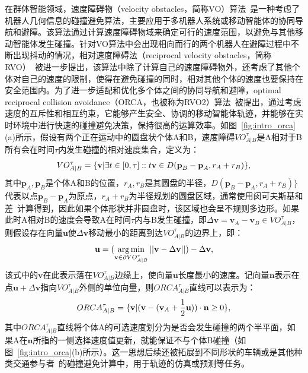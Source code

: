 在群体智能领域，速度障碍物（velocity obstacles，简称VO）算法~\cite{fiorini1998motion}是一种考虑了机器人几何信息的碰撞避免算法，主要应用于多机器人系统或移动智能体的协同导航和避障。该算法通过计算速度障碍物域来确定可行的速度范围，以避免与其他移动智能体发生碰撞。针对VO算法中会出现相向而行的两个机器人在避障过程中不断出现抖动的情况，相对速度障碍法（reciprocal velocity obstacles，简称RVO）~\cite{van2008reciprocal}被进一步提出，该算法中除了计算自己的速度障碍物外，还考虑了其他个体对自己的速度的限制，使得在避免碰撞的同时，相对其他个体的速度也要保持在安全范围内。为了进一步适配和优化多个体之间的协同导航和避障，optimal reciprocal collision avoidance（ORCA，也被称为RVO2）算法~\cite{van2011reciprocal}被提出，通过考虑速度的互斥性和相互约束，它能够产生安全、协调的移动智能体轨迹，并能够在实时环境中进行快速的碰撞避免决策，保持很高的运算效率。如图~\ref{fig:intro_orca}(a)所示，假设有两个正在运动中的圆盘状个体A和B，速度障碍$VO^{\tau}_{A|B}$是A相对于B所有会在时间$\tau$内发生碰撞的相对速度集合，定义为：
\begin{equation}
\setlength\abovedisplayskip{10pt}
\setlength\belowdisplayskip{10pt}
\label{eq:intro_orca1}
    VO^{\tau}_{A|B} = \{ \textbf{v} | \exists t \in [0, \tau] :: t\textbf{v} \in D(\textbf{p}_B - \textbf{p}_A, r_A + r_B) \},
\end{equation}
其中$\textbf{p}_A, \textbf{p}_B$是个体A和B的位置，$r_A, r_B$是其圆盘的半径，$D(\textbf{p}_B - \textbf{p}_A, r_A + r_B) \}$代表以点$\textbf{p}_B - \textbf{p}_A$为原点，$r_A+r_B$为半径规划的圆盘区域，通常使用闵可夫斯基和差~\cite{hadwiger1950minkowskische}计算得到，因此如果个体形状并非圆盘时，该区域也会呈不规则多边形。如果此时A相对B的速度会导致A在时间$\tau$内与B发生碰撞，即$\Delta\textbf{v}=\textbf{v}_A - \textbf{v}_B \in VO^{\tau}_{A|B}$，则假设存在向量$\textbf{u}$使$\Delta\textbf{v}$移动最小的距离到达$VO^{\tau}_{A|B}$的边界上，即：
\begin{equation}
\setlength\abovedisplayskip{10pt}
\setlength\belowdisplayskip{10pt}
\label{eq:intro_orca2}
    \textbf{u} = (\mathop{\arg\min}\limits_{ \textbf{v} \in \partial VO^{\tau}_{A|B}} || \textbf{v} - \Delta\textbf{v} || ) - \Delta\textbf{v},
\end{equation}
该式中的$\textbf{v}$在此表示落在$VO^{\tau}_{A|B}$边缘上，使向量$\textbf{u}$长度最小的速度。记向量$\textbf{n}$表示在点$\textbf{u} + \Delta\textbf{v}$指向$VO^{\tau}_{A|B}$外侧的单位向量，则$ORCA^{\tau}_{A|B}$直线可以表示为：
\begin{equation}
\setlength\abovedisplayskip{10pt}
\setlength\belowdisplayskip{10pt}
\label{eq:intro_orca3}
    ORCA^{\tau}_{A|B} = \{ \textbf{v} | (\textbf{v} - (\textbf{v}_A + \frac{1}{2}\textbf{u}))\cdot\textbf{n} \geq 0 \},
\end{equation}
其中$ORCA^{\tau}_{A|B}$直线将个体A的可选速度划分为是否会发生碰撞的两个半平面，如果A在$\textbf{n}$所指的一侧选择速度值更新，就能保证不与个体B碰撞（如图~\ref{fig:intro_orca}(b)所示）。这一思想后续还被拓展到不同形状的车辆或是其他种类交通参与者~\cite{ma2018efficient, luo2022gamma}的碰撞避免计算中，用于轨迹的仿真或预测等任务。

